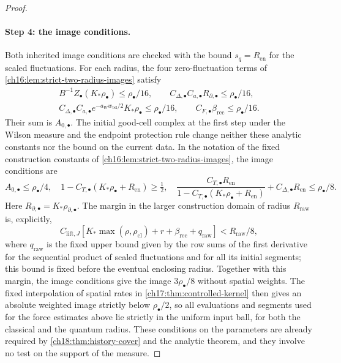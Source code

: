\begin{proof}
\paragraph{Step 4: the image conditions.}
Both inherited image conditions are checked with the bound $s_q=R_{\mathrm{en}}$ for the scaled fluctuations. For each radius, the four zero-fluctuation terms of \cref{ch16:lem:strict-two-radius-images} satisfy
\[
 \begin{gathered}
 B^{-1}Z_\bullet(K_*\rho_\bullet)\le\rho_\bullet/16,
 \qquad
 C_{\Delta,\bullet}C_{a,\bullet}R_{\partial,\bullet}
                                     \le\rho_\bullet/16,\\
 C_{\Delta,\bullet}C_{a,\bullet}
 e^{-a_Ww_{\mathrm{bd}}/2}K_*\rho_\bullet
                                     \le\rho_\bullet/16,
 \qquad C_{F,\bullet}\beta_{\mathrm{rec}}
                                     \le\rho_\bullet/16.
 \end{gathered}
\]
Their sum is $A_{0,\bullet}$. The initial good-cell complex at the first step under the Wilson measure and the endpoint protection rule change neither these analytic constants nor the bound on the current data. In the notation of the fixed construction constants of \cref{ch16:lem:strict-two-radius-images}, the image conditions are
\begin{equation}\label{ch18:eq:two-input-image-check}
 A_{0,\bullet}\le\rho_\bullet/4,\quad
 1-C_{T,\bullet}(K_*\rho_\bullet+R_{\mathrm{en}})\ge\tfrac12,
 \quad
 \frac{C_{T,\bullet}R_{\mathrm{en}}}
 {1-C_{T,\bullet}(K_*\rho_\bullet+R_{\mathrm{en}})}
      +C_{\Delta,\bullet}R_{\mathrm{en}}\le\rho_\bullet/8.
\end{equation}
Here $R_{\partial,\bullet}=K_*\rho_{\partial,\bullet}$. The margin in the larger construction domain of radius $R_{\mathrm{raw}}$ is, explicitly,
\[
 C_{\mathrm{lift},J}
 [K_*\max(\rho,\rho_{\mathrm{cl}})+r+
             \beta_{\mathrm{rec}}+q_{\mathrm{raw}}]
                                      <R_{\mathrm{raw}}/8,
\]
where $q_{\mathrm{raw}}$ is the fixed upper bound given by the row sums of the first derivative for the sequential product of scaled fluctuations and for all its initial segments; this bound is fixed before the eventual enclosing radius. Together with this margin, the image conditions give the image $3\rho_\bullet/8$ without spatial weights. The fixed interpolation of spatial rates in \cref{ch17:thm:controlled-kernel} then gives an absolute weighted image strictly below $\rho_\bullet/2$, so all evaluations and segments used for the force estimates above lie strictly in the uniform input ball, for both the classical and the quantum radius. These conditions on the parameters are already required by \cref{ch18:thm:history-cover} and the analytic theorem, and they involve no test on the support of the measure.


\end{proof}
